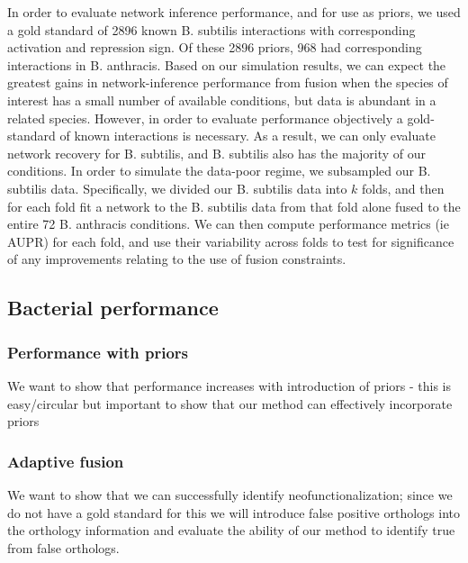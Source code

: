 \documentclass[11pt]{article}
\begin{document}
In order to evaluate network inference performance, and for use as priors, we used a gold standard of 2896 known B. subtilis interactions with corresponding activation and repression sign. Of these 2896 priors, 968 had corresponding interactions in B. anthracis. Based on our simulation results, we can expect the greatest gains in network-inference performance from fusion when the species of interest has a small number of available conditions, but data is abundant in a related species. However, in order to evaluate performance objectively a gold-standard of known interactions is necessary. As a result, we can only evaluate network recovery for B. subtilis, and B. subtilis also has the majority of our conditions. In order to simulate the data-poor regime, we subsampled our B. subtilis data. Specifically, we divided our B. subtilis data into $k$ folds, and then for each fold fit a network to the B. subtilis data from that fold alone fused to the entire 72 B. anthracis conditions. We can then compute performance metrics (ie AUPR) for each fold, and use their variability across folds to test for significance of any improvements relating to the use of fusion constraints. 

\subsection{Bacterial performance}
\subsubsection{Performance with priors}
We want to show that performance increases with introduction of priors - this is easy/circular but important to show that our method can effectively incorporate priors

\subsubsection{Adaptive fusion}
We want to show that we can successfully identify neofunctionalization; since we do not have a gold standard for this we will introduce false positive orthologs into the orthology information and evaluate the ability of our method to identify true from false orthologs. 
\end{document}

